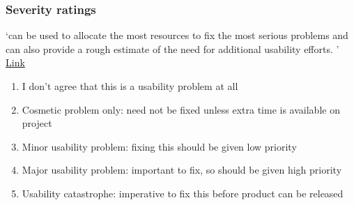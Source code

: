 \begin{frame}
	\frametitle{Severity ratings}
	`can be used to allocate the most resources to fix the most serious problems and can also provide a rough estimate of the need for additional usability efforts. ' \href{https://www.nngroup.com/articles/how-to-rate-the-severity-of-usability-problems/}{Link}
	
	\begin{enumerate}
		\setcounter{enumi}{0}
		\item I don't agree that this is a usability problem at all 
		\item Cosmetic problem only: need not be fixed unless extra time is available on project 
		\item Minor usability problem: fixing this should be given low priority 
		\item Major usability problem: important to fix, so should be given high priority 
		\item Usability catastrophe: imperative to fix this before product can be released
	\end{enumerate}

\end{frame}












